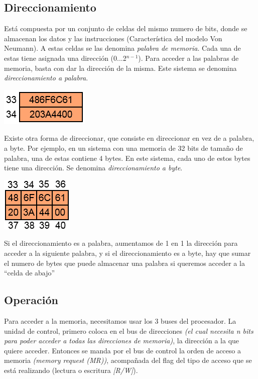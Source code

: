 \documentclass[a4paper,11pt,spanish]{report}
\begin{document}
\subsection{Direccionamiento}
Está compuesta por un conjunto de celdas del mismo numero de bits, donde se almacenan los datos y las instrucciones (Característica del modelo Von Neumann). 
A estas celdas se las denomina \emph{palabra de memoria}. 
Cada una de estas tiene asignada una dirección (0...2$^{n-1}$).
Para acceder a las palabras de memoria, basta con dar la dirección de la misma. Este sistema se denomina \emph{direccionamiento a palabra}.
\begin{center}
\includegraphics{res/tema1/memoriapalabra.png}
\end{center}
Existe otra forma de direccionar, que consiste en direccionar en vez de a palabra, a byte. Por ejemplo, en un sistema con una memoria de 32 bits de tamaño de palabra, una de estas contiene 4 bytes. En este sistema, cada uno de estos bytes tiene una dirección. Se denomina  \emph{direccionamiento a byte}.

\begin{center}
\includegraphics{res/tema1/memoriabyte.png}
\end{center}

Si el direccionamiento es a palabra, aumentamos de 1 en 1 la dirección para acceder a la siguiente palabra, y si el direccionamiento es a byte, hay que sumar el numero de bytes que puede almacenar una palabra si queremos acceder a la \textquotedblleft celda de abajo\textquotedblright
\subsection{Operación}
Para acceder a la memoria, necesitamos usar los 3 buses del procesador. La unidad de control, primero coloca en el bus de direcciones \emph{(el cual necesita n bits para poder acceder a  todas las direcciones de memoria)}, la dirección a la que quiere acceder. Entonces se manda por el bus de control la orden de acceso a memoria \emph{(memory request (MR))}, acompañada del flag del tipo de acceso que se está realizando (lectura o escritura \emph{[R/W]}).
\end{document}
